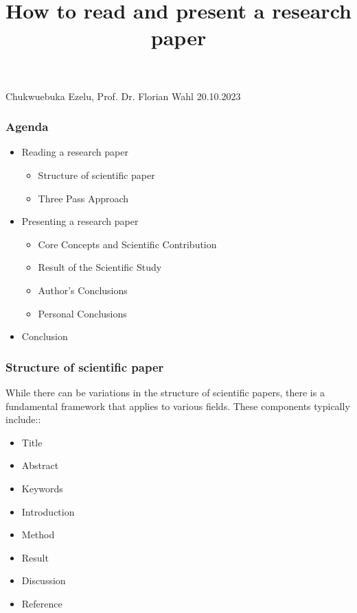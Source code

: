\documentclass[11pt,xcolor={dvipsnames},hyperref={pdftex,pdfpagemode=UseNone,hidelinks,pdfdisplaydoctitle=true},usepdftitle=false]{beamer}
\begin{document}
\title{How to read and present a research paper}
\information%
{Chukwuebuka Ezelu, Prof. Dr. Florian Wahl}%
{20.10.2023}
\frame{\titlepage}

\begin{frame}
	\frametitle{Agenda}
	\begin{itemize}
		\item Reading a research paper
		\begin{itemize}
			\item Structure of scientific paper
			\item Three Pass Approach
		\end{itemize}
		\item Presenting a research paper
		\begin{itemize}
			\item Core Concepts and Scientific Contribution
			\item Result of the Scientific Study
			\item Author's Conclusions
			\item Personal Conclusions
		\end{itemize}
		\item Conclusion
	\end{itemize}
\end{frame}

\begin{frame}
\end{frame}

\begin{frame}
\frametitle{Structure of scientific paper}
While there can be variations in the structure of scientific papers, there is a fundamental framework that applies to various fields. These components typically include::
\begin{itemize}
\item Title
\item Abstract
\item Keywords
\item Introduction
\item Method
\item Result
\item Discussion
\item Reference
\end{itemize}
\end{frame}
\end{document}
